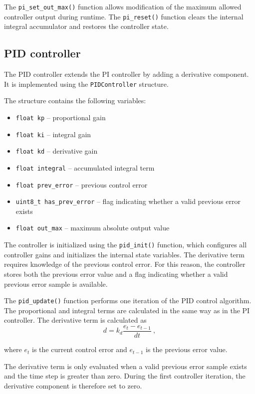 The \texttt{pi\_set\_out\_max()} function allows modification of the maximum allowed controller output during runtime.
The \texttt{pi\_reset()} function clears the internal integral accumulator and restores the controller state.

\subsection{PID controller}

The PID controller extends the PI controller by adding a derivative component.
It is implemented using the \texttt{PIDController} structure.

The structure contains the following variables:
\begin{itemize}
    \item \texttt{float kp} -- proportional gain
    \item \texttt{float ki} -- integral gain
    \item \texttt{float kd} -- derivative gain
    \item \texttt{float integral} -- accumulated integral term
    \item \texttt{float prev\_error} -- previous control error
    \item \texttt{uint8\_t has\_prev\_error} -- flag indicating whether a valid previous error exists
    \item \texttt{float out\_max} -- maximum absolute output value
\end{itemize}

The controller is initialized using the \texttt{pid\_init()} function, which configures all controller gains and initializes the internal state variables.
The derivative term requires knowledge of the previous control error.
For this reason, the controller stores both the previous error value and a flag indicating whether a valid previous error sample is available.

The \texttt{pid\_update()} function performs one iteration of the PID control algorithm.
The proportional and integral terms are calculated in the same way as in the PI controller.
The derivative term is calculated as
\begin{equation}
    d = k_d \frac{e_t - e_{t-1}}{dt}~,
\end{equation}

where \(e_t\) is the current control error and \(e_{t-1}\) is the previous error value.

The derivative term is only evaluated when a valid previous error sample exists and the time step is greater than zero.
During the first controller iteration, the derivative component is therefore set to zero.

